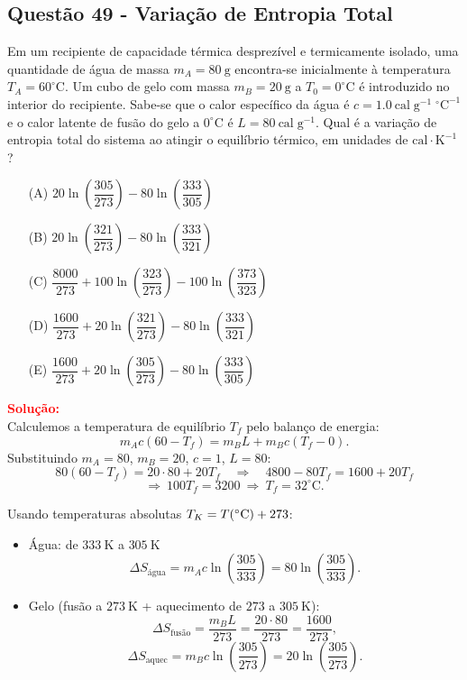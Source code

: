 \documentclass[a4paper,12pt]{article}
\begin{document}
\begin{flushleft}
\subsection{Quest\~ao 49 - Variação de Entropia Total}
Em um recipiente de capacidade térmica desprezível e termicamente isolado, uma quantidade de água de massa \(m_A=80\ \mathrm{g}\) 
encontra-se inicialmente à temperatura \(T_A=60^\circ\mathrm{C}\). Um cubo de gelo com massa \(m_B=20\ \mathrm{g}\) a \(T_0=0^\circ\mathrm{C}\) é 
introduzido no interior do recipiente. Sabe-se que o calor específico da água é \(c=1{.}0\ \mathrm{cal\;g^{-1}\;^\circ C^{-1}}\) e o calor 
latente de fusão do gelo a \(0^\circ\mathrm{C}\) é \(L=80\ \mathrm{cal\;g^{-1}}\). Qual é a variação de entropia total do sistema ao atingir 
o equilíbrio térmico, em unidades de \(\mathrm{cal\cdot K^{-1}}\)?

\begin{itemize}
\item[(A)] \(20\ln\!\left(\dfrac{305}{273}\right) - 80\ln\!\left(\dfrac{333}{305}\right)\)
\item[(B)] \(20\ln\!\left(\dfrac{321}{273}\right) - 80\ln\!\left(\dfrac{333}{321}\right)\)
\item[(C)] \(\dfrac{8000}{273} + 100\ln\!\left(\dfrac{323}{273}\right) - 100\ln\!\left(\dfrac{373}{323}\right)\)
\item[(D)] \(\dfrac{1600}{273} + 20\ln\!\left(\dfrac{321}{273}\right) - 80\ln\!\left(\dfrac{333}{321}\right)\)
\item[(E)] \(\dfrac{1600}{273} + 20\ln\!\left(\dfrac{305}{273}\right) - 80\ln\!\left(\dfrac{333}{305}\right)\)
\end{itemize}

\vspace{0.5cm}

\textcolor{red}{\textbf{Solução:}}\\

Calculemos a temperatura de equilíbrio \(T_f\) pelo balanço de energia:
\[
m_A c (60 - T_f) = m_B L + m_B c (T_f - 0).
\]
Substituindo \(m_A=80\), \(m_B=20\), \(c=1\), \(L=80\):
\[
80(60 - T_f) = 20\cdot 80 + 20 T_f \quad\Rightarrow\quad 4800 - 80T_f = 1600 + 20T_f
\]
\[
\Rightarrow\ 100T_f = 3200 \ \Rightarrow\ T_f = 32^\circ\mathrm{C}.
\]

Usando temperaturas absolutas \(T_K=T(^{\circ}{\rm C})+273\):
\begin{itemize}
\item Água: de \(333\ \mathrm{K}\) a \(305\ \mathrm{K}\)
\[
\Delta S_{\text{água}} = m_A c \ln\!\left(\frac{305}{333}\right) = 80\ln\!\left(\frac{305}{333}\right).
\]
\item Gelo (fusão a \(273\ \mathrm{K}\) + aquecimento de \(273\) a \(305\ \mathrm{K}\)):
\[
\Delta S_{\text{fusão}} = \frac{m_B L}{273} = \frac{20\cdot 80}{273} = \frac{1600}{273},
\]
\[
\Delta S_{\text{aquec}} = m_B c \ln\!\left(\frac{305}{273}\right)=20\ln\!\left(\frac{305}{273}\right).
\]
\end{itemize}


\end{flushleft}
\end{document}
